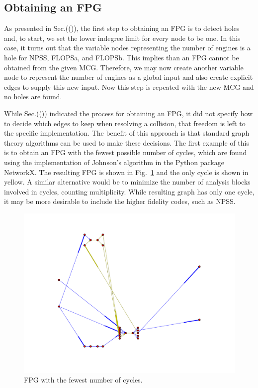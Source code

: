 \subsection{Obtaining an FPG}
As presented in Sec.(()), the first step to obtaining an FPG is to detect holes and, to start, we set the lower indegree limit for every node to be one. In this case, it turns out that the variable nodes representing the number of engines is a hole for NPSS, FLOPSa, and FLOPSb. This implies than an FPG cannot be obtained from the given MCG. Therefore, we may now create another variable node to represent the number of engines as a global input and also create explicit edges to supply this new input. Now this step is repeated with the new MCG and no holes are found.

While Sec.(()) indicated the process for obtaining an FPG, it did not specify how to decide which edges to keep when resolving a collision, that freedom is left to the specific implementation. The benefit of this approach is that standard graph theory algorithms can be used to make these decisions. The first example of this is to obtain an FPG with the fewest possible number of cycles, which are found using the implementation of Johnson's algorithm \cite{Johnson1975} in the Python package NetworkX. The resulting FPG is shown in Fig.~\ref{f:FPG fewest cycles} and the only cycle is shown in yellow. A similar alternative would be to minimize the number of analysis blocks involved in cycles, counting multiplicity. While resulting graph has only one cycle, it may be more desirable to include the higher fidelity codes, such as NPSS.
\begin{figure}[htb!]
  \begin{center}
    \includegraphics[width=.6\textwidth]{images/FPG_fewest_cycles}
  \end{center}
  \caption{FPG with the fewest number of cycles.}
\label{f:FPG fewest cycles}
\end{figure}

